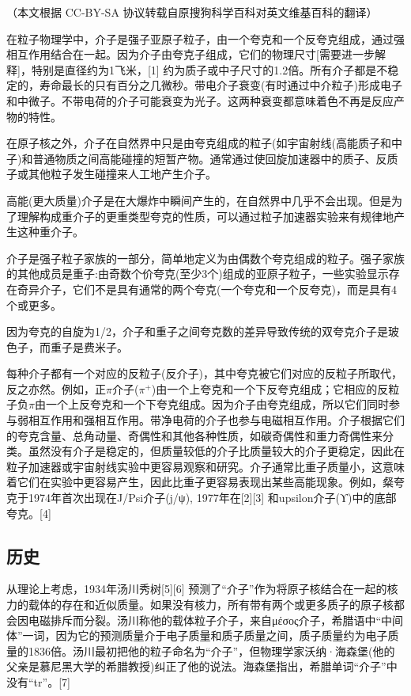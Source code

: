 （本文根据 CC-BY-SA 协议转载自原搜狗科学百科对英文维基百科的翻译）

在粒子物理学中，介子是强子亚原子粒子，由一个夸克和一个反夸克组成，通过强相互作用结合在一起。因为介子由夸克子组成，它们的物理尺寸[需要进一步解释]，特别是直径约为1飞米，[1] 约为质子或中子尺寸的1.2倍。所有介子都是不稳定的，寿命最长的只有百分之几微秒。带电介子衰变(有时通过中介粒子)形成电子和中微子。不带电荷的介子可能衰变为光子。这两种衰变都意味着色不再是反应产物的特性。

在原子核之外，介子在自然界中只是由夸克组成的粒子(如宇宙射线(高能质子和中子)和普通物质之间高能碰撞的短暂产物。通常通过使回旋加速器中的质子、反质子或其他粒子发生碰撞来人工地产生介子。

高能(更大质量)介子是在大爆炸中瞬间产生的，在自然界中几乎不会出现。但是为了理解构成重介子的更重类型夸克的性质，可以通过粒子加速器实验来有规律地产生这种重介子。

介子是强子粒子家族的一部分，简单地定义为由偶数个夸克组成的粒子。强子家族的其他成员是重子:由奇数个价夸克(至少3个)组成的亚原子粒子，一些实验显示存在奇异介子，它们不是具有通常的两个夸克(一个夸克和一个反夸克)，而是具有4个或更多。

因为夸克的自旋为1/2，介子和重子之间夸克数的差异导致传统的双夸克介子是玻色子，而重子是费米子。

每种介子都有一个对应的反粒子(反介子)，其中夸克被它们对应的反粒子所取代，反之亦然。例如，正$\pi$介子($\pi^+$)由一个上夸克和一个下反夸克组成；它相应的反粒子负$\pi$由一个上反夸克和一个下夸克组成。因为介子由夸克组成，所以它们同时参与弱相互作用和强相互作用。带净电荷的介子也参与电磁相互作用。介子根据它们的夸克含量、总角动量、奇偶性和其他各种性质，如碳奇偶性和重力奇偶性来分类。虽然没有介子是稳定的，但质量较低的介子比质量较大的介子更稳定，因此在粒子加速器或宇宙射线实验中更容易观察和研究。介子通常比重子质量小，这意味着它们在实验中更容易产生，因此比重子更容易表现出某些高能现象。例如，粲夸克于1974年首次出现在J/Psi介子(j/ψ), 1977年在[2][3] 和upsilon介子(ϒ)中的底部夸克。[4]

\subsection{历史}
从理论上考虑，1934年汤川秀树[5][6] 预测了“介子”作为将原子核结合在一起的核力的载体的存在和近似质量。如果没有核力，所有带有两个或更多质子的原子核都会因电磁排斥而分裂。汤川称他的载体粒子介子，来自μέσος介子，希腊语中“中间体”一词，因为它的预测质量介于电子质量和质子质量之间，质子质量约为电子质量的1836倍。汤川最初把他的粒子命名为“介子”，但物理学家沃纳·海森堡(他的父亲是慕尼黑大学的希腊教授)纠正了他的说法。海森堡指出，希腊单词“介子”中没有“tr”。[7]

